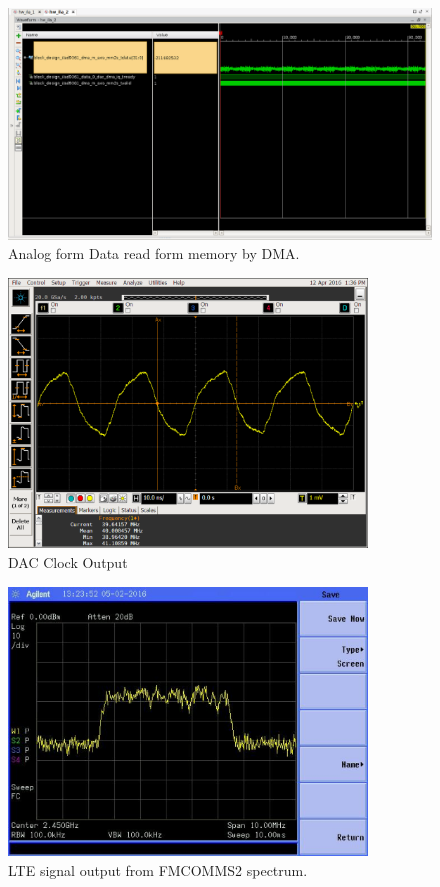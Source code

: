 \begin{figure}[htbp]
    \centering
    \includegraphics[width=1\textwidth,
    trim={{.11\textwidth} {.95\textwidth} {.04\textwidth} {.15\textwidth}},
    clip]{./figures/ltedac_ila}
    \caption{ Analog form Data read form memory by DMA.
    \label{fig:dataflowana}}
\end{figure}

\begin{figure}[htbp]
    \centering
    \includegraphics[width=0.85\textwidth]{./figures/oscill_ad9361_dac_clk}
    \caption{ DAC Clock Output
    \label{fig:dacclk}}
\end{figure}

\begin{figure}[htbp]
    \centering
    \includegraphics[width=0.85\textwidth]{./figures/lte_5m}
    \caption{ LTE signal output from FMCOMMS2 spectrum.
    \label{fig:lte5m}}
\end{figure}


